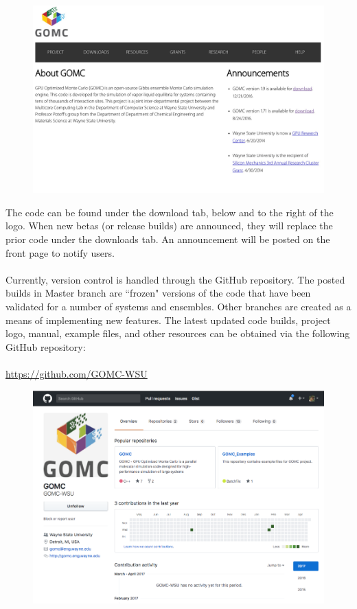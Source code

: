 \begin{figure}[H]
\centering
\includegraphics[scale=0.15]{images/website}
\end{figure}

The code can be found under the download tab, below and to the right of the logo.  When new betas (or release builds) are announced, they will replace the prior code under the downloads tab.  An announcement will be posted on the front page to notify users. \\\\
Currently, version control is handled through the GitHub repository.  The posted builds in Master branch are ``frozen" versions of the code that have been validated for a number of systems and ensembles. Other branches are created as a means of implementing new features. The latest updated code builds, project logo, manual, example files, and other resources can be obtained via the following GitHub repository:\\\\
\url{https://github.com/GOMC-WSU}

\begin{figure}[H]
\centering
\includegraphics[scale=0.6]{images/github}
\end{figure}

